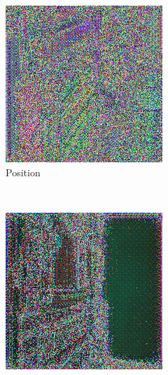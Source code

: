 \begin{figure}[h!]
    \centering
    \begin{subfigure}[b]{0.175\textwidth}
     \includegraphics[width=\textwidth]{figures/result/quadruple/albedo_normal_emissive_position/1.png}
     \caption{Position}\label{subfig:1}
    \end{subfigure}
    ~
    \begin{subfigure}[b]{0.175\textwidth}
     \includegraphics[width=\textwidth]{figures/result/quadruple/albedo_normal_emissive_metalness/1.png}

\end{subfigure}
\end{figure}
